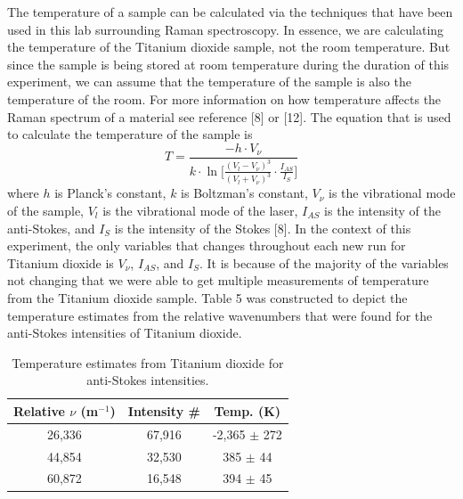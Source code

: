 \documentclass[twocolumn]{article}
\begin{document}
The temperature of a sample can be calculated via the techniques that have been used in this lab surrounding Raman spectroscopy. In essence, we are calculating the temperature of the Titanium dioxide sample, not the room temperature. But since the sample is being stored at room temperature during the duration of this experiment, we can assume that the temperature of the sample is also the temperature of the room. For more information on how temperature affects the Raman spectrum of a material see reference [8] or [12]. The equation that is used to calculate the temperature of the sample is 
\begin{equation}\label{1}
	T=\frac{-h\cdot V_{\nu}}{k\cdot\ln{[\frac{(V_{l}-V_{\nu})^{3}}{(V_{l}+V_{\nu})^{3}}\cdot\frac{I_{AS}}{I_{S}}}]}
\end{equation}
where $h$ is Planck's constant, $k$ is Boltzman's constant, $V_{\nu}$ is the vibrational mode of the sample, $V_{l}$ is the vibrational mode of the laser, $I_{AS}$ is the intensity of the anti-Stokes, and $I_{S}$ is the intensity of the Stokes [8]. In the context of this experiment, the only variables that changes throughout each new run for Titanium dioxide is $V_{\nu}$, $I_{AS}$, and $I_{S}$. It is because of the majority of the variables not changing that we were able to get multiple measurements of temperature from the Titanium dioxide sample. Table 5 was constructed to depict the temperature estimates from the relative wavenumbers that were found for the anti-Stokes intensities of Titanium dioxide.
\begin{table}[htp]
\begin{center}
\begin{tabular}{|c|c|c|}
	\hline \textbf{Relative $\nu$ (m$^{-1}$)} & \textbf{Intensity \#} & \textbf{Temp. (K)} \\ \hline
	26,336 & 67,916 & -2,365 $\pm$ 272 \\ \hline
	44,854 & 32,530 & 385 $\pm$ 44 \\ \hline
	60,872 & 16,548 & 394 $\pm$ 45 \\ \hline
\end{tabular}
\caption{Temperature estimates from Titanium dioxide for anti-Stokes intensities.}
\end{center}
\label{default}
\end{table}%
\end{document}
